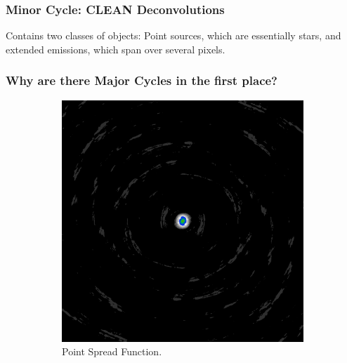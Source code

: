 \subsubsection{Minor Cycle: CLEAN Deconvolutions}
Contains two classes of objects: Point sources, which are essentially stars, and extended emissions, which span over several pixels.


\subsubsection{Why are there Major Cycles in the first place?}
\begin{figure}[h]
	\centering
	\begin{subfigure}[b]{0.3\linewidth}
		\includegraphics[width=\linewidth]{./chapters/01.intro/mk2/psf.png}
		\caption{Point Spread Function.}
		\label{results:points:tclean}
	\end{subfigure}
	\begin{subfigure}[b]{0.3\linewidth}

\end{subfigure}
\end{figure}
